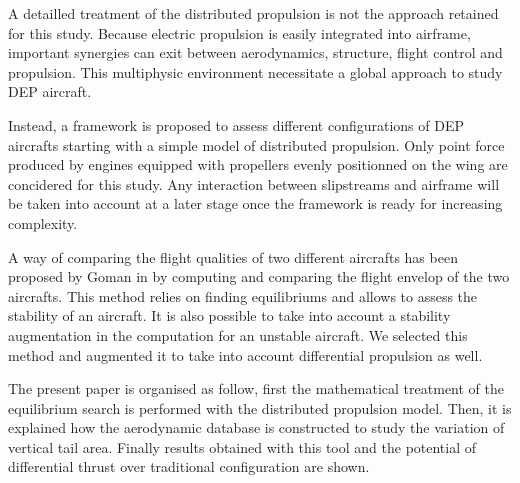 A detailled treatment of the distributed propulsion is not the approach retained for this study. Because electric propulsion is easily integrated into airframe, important synergies can exit between aerodynamics, structure, flight control and propulsion. This multiphysic environment necessitate a global approach to study DEP aircraft. %

Instead, a framework is proposed to assess different configurations of DEP aircrafts starting with a simple model of distributed propulsion. Only point force produced by engines equipped with propellers evenly positionned on the wing are concidered for this study. Any interaction between slipstreams and airframe will be taken into account at a later stage once the framework is ready for increasing complexity.

A way of comparing the flight qualities of two different aircrafts has been proposed by Goman in \cite{GomanAttainableEqui} by computing and comparing the flight envelop of the two aircrafts. This method relies on finding equilibriums and allows to assess the stability of an aircraft. It is also possible to take into account a stability augmentation in the computation for an unstable aircraft. We selected this method and augmented it to take into account differential propulsion as well.

The present paper is organised as follow, first the mathematical treatment of the equilibrium search is performed with the distributed propulsion model. Then, it is explained how the aerodynamic database is constructed to study the variation of vertical tail area. Finally results obtained with this tool and the potential of differential thrust over traditional configuration are shown.

%
